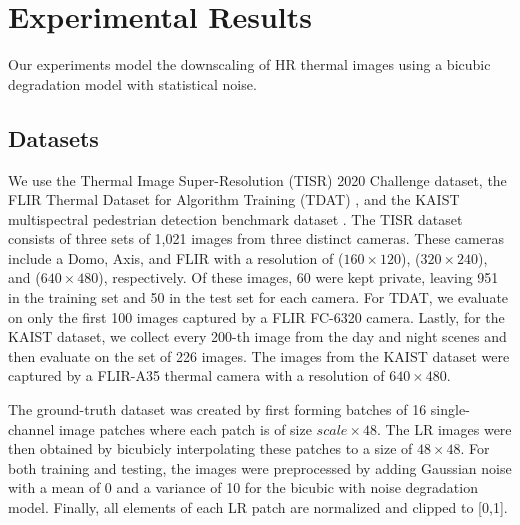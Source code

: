 \documentclass[runningheads]{llncs}
\begin{document}
\section{Experimental Results}
\label{sec:experimental_results}
Our experiments model the downscaling of HR thermal images using a bicubic
degradation model with statistical noise.

\subsection{Datasets}
We use the Thermal Image Super-Resolution (TISR) 2020 Challenge dataset, the
FLIR Thermal Dataset for Algorithm Training (TDAT) \cite{flir2021}, and the
KAIST multispectral pedestrian detection benchmark dataset
\cite{hwang2015multispectral}. The TISR dataset consists of three sets of 1,021
images from three distinct cameras. These cameras include a Domo, Axis, and
FLIR with a resolution of ($160 \times 120$), ($320 \times 240$), and ($640
\times 480$), respectively. Of these images, 60 were kept private, leaving 951
in the training set and 50 in the test set for each camera. For TDAT, we
evaluate on only the first 100 images captured by a FLIR FC-6320 camera.
Lastly, for the KAIST dataset, we collect every 200-th image from the day and
night scenes and then evaluate on the set of 226 images. The images from the
KAIST dataset were captured by a FLIR-A35 thermal camera with a resolution of
$640 \times 480$.

The ground-truth dataset was created by first forming batches of 16
single-channel image patches where each patch is of size $scale \times 48$. The
LR images were then obtained by bicubicly interpolating these patches to a size
of $48 \times 48$. For both training and testing, the images were preprocessed
by adding Gaussian noise with a mean of 0 and a variance of 10 for the bicubic
with noise degradation model. Finally, all elements of each LR patch are
normalized and clipped to [0,1].

\end{document}
